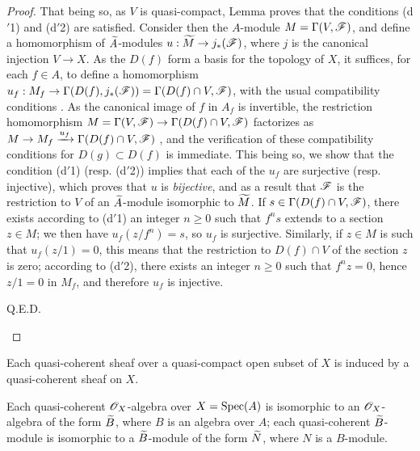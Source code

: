 \begin{proof}
That being so, as $V$ is quasi-compact, Lemma  proves that
the conditions (d$'$1) and (d$'$2) are satisfied. Consider then the $A$-module
$M=\Gamma(V,\mathscr{F})$, and define a homomorphism of $\widetilde{A}$-modules
$u:\widetilde{M}\to j_*(\mathscr{F})$, where $j$ is the canonical injection $V\to X$. As the
$D(f)$ form a basis for the topology of $X$, it suffices, for each $f\in A$, to define a
homomorphism $u_f:M_f\to\Gamma(D(f),j_*(\mathscr{F}))=\Gamma(D(f)\cap V,\mathscr{F})$, with the usual
compatibility conditions . As the canonical image of $f$ in $A_f$ is
invertible, the restriction homomorphism $M=\Gamma(V,\mathscr{F})\to\Gamma(D(f)\cap V,\mathscr{F})$
factorizes as $M\to M_f\xrightarrow{u_f}\Gamma(D(f)\cap V,\mathscr{F})$ , and the
verification of these compatibility conditions for $D(g)\subset D(f)$ is immediate. This being
so, we show that the condition (d$'$1) (resp. (d$'$2)) implies that each of the $u_f$ are
surjective (resp. injective), which proves that $u$ is \emph{bijective}, and as a result that
$\mathscr{F}$ is the restriction to $V$ of an $\widetilde{A}$-module isomorphic to
$\widetilde{M}$. If $s\in\Gamma(D(f)\cap V,\mathscr{F})$, there exists according to (d$'$1) an
integer $n\geqslant 0$ such that $f^n s$ extends to a section $z\in M$; we then have
$u_f(z/f^n)=s$, so $u_f$ is surjective. Similarly, if $z\in M$ is such that $u_f(z/1)=0$,
this means that the restriction to $D(f)\cap V$ of the section $z$ is zero; according to
(d$'$2), there exists an integer $n\geqslant 0$ such that $f^n z=0$, hence $z/1=0$ in $M_f$,
and therefore $u_f$ is injective.
\begin{flushright}
Q.E.D.
\end{flushright}
\end{proof}

\begin{cor}[1.4.2]
\label{1.1.4.2}
Each quasi-coherent sheaf over a quasi-compact open subset of $X$ is induced by a
quasi-coherent sheaf on $X$.
\end{cor}

\begin{cor}[1.4.3]
\label{1.1.4.3}
Each quasi-coherent $\mathscr{O}_X$-algebra over $X={\mathop{\mathrm{Spec}}\nolimits}(A)$ is isomorphic to an $\mathscr{O}_X$-algebra of
the form $\widetilde{B}$, where $B$ is an algebra over $A$; each quasi-coherent
$\widetilde{B}$-module is isomorphic to a $\widetilde{B}$-module of the form $\widetilde{N}$,
where $N$ is a $B$-module.
\end{cor}

